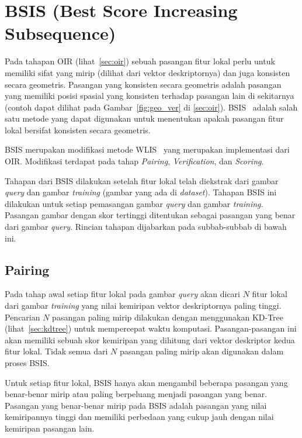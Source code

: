 \section{BSIS (Best Score Increasing Subsequence)}
\label{sec:bsis}
Pada tahapan OIR (lihat~\ref{sec:oir}) sebuah pasangan fitur lokal perlu untuk memiliki sifat yang mirip (dilihat dari vektor deskriptornya) dan juga konsisten secara geometris. Pasangan yang konsisten secara geometris adalah pasangan yang memiliki posisi spasial yang konsisten terhadap pasangan lain di sekitarnya (contoh dapat dilihat pada Gambar~\ref{fig:geo_ver} di \ref{sec:oir}). BSIS~\cite{kusuma2019geometric} adalah salah satu metode yang dapat digunakan untuk menentukan apakah pasangan fitur lokal bersifat konsisten secara geometris. 

BSIS merupakan modifikasi metode WLIS~\cite{kusuma2012appearance} yang merupakan implementasi dari OIR. Modifikasi terdapat pada tahap \textit{Pairing}, \textit{Verification}, dan \textit{Scoring}. 

Tahapan dari BSIS dilakukan setelah fitur lokal telah diekstrak dari gambar \textit{query} dan gambar \textit{training} (gambar yang ada di \textit{dataset}). Tahapan BSIS ini dilakukan untuk setiap pemasangan gambar \textit{query} dan gambar \textit{training}. Pasangan gambar dengan skor tertinggi ditentukan sebagai pasangan yang benar dari gambar \textit{query}. Rincian tahapan dijabarkan pada subbab-subbab di bawah ini. 

\subsection{Pairing}
\label{subsec:bsis_pairing}
Pada tahap awal setiap fitur lokal pada gambar \textit{query} akan dicari $N$ fitur lokal dari gambar \textit{training} yang nilai kemiripan vektor deskriptornya paling tinggi. Pencarian $N$ pasangan paling mirip dilakukan dengan menggunakan KD-Tree (lihat~\ref{sec:kdtree}) untuk mempercepat waktu komputasi. Pasangan-pasangan ini akan memiliki sebuah skor kemiripan yang dihitung dari vektor deskriptor kedua fitur lokal. Tidak semua dari $N$ pasangan paling mirip akan digunakan dalam proses BSIS. 

Untuk setiap fitur lokal, BSIS hanya akan mengambil beberapa pasangan yang benar-benar mirip atau paling berpeluang menjadi pasangan yang benar. Pasangan yang benar-benar mirip pada BSIS adalah pasangan yang nilai kemiripannya tinggi dan memiliki perbedaan yang cukup jauh dengan nilai kemiripan pasangan lain. 


